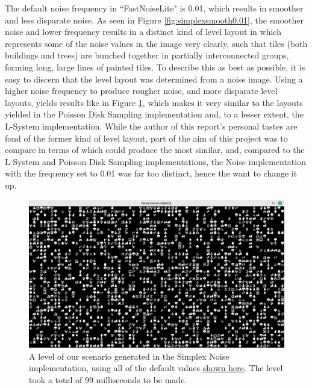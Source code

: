 The default noise frequency in ``FastNoiseLite" is 0.01, which results in smoother and less disparate noise. As seen in Figure \ref{fig:simplexsmooth0.01}, the smoother noise and lower frequency results in a distinct kind of level layout in which represents some of the noise values in the image very clearly, such that tiles (both buildings and trees) are bunched together in partially interconnected groups, forming long, large lines of painted tiles. To describe this as best as possible, it is easy to discern that the level layout was determined from a noise image. Using a higher noise frequency to produce rougher noise, and more disparate level layouts, yields results like in Figure \ref{fig:simplexsmoothdefault1}, which makes it very similar to the layouts yielded in the Poisson Disk Sampling implementation and, to a lesser extent, the L-System implementation. While the author of this report's personal tastes are fond of the former kind of level layout, part of the aim of this project was to compare in terms of which could produce the most similar, and, compared to the L-System and Poisson Disk Sampling implementations, the Noise implementation with the frequency set to 0.01 was far too distinct, hence the want to change it up.

\begin{figure}[H]
    \centering
    \includegraphics[width=\textwidth]{Images/simplex_smooth_default_1.png}
    \caption{A level of our scenario generated in the Simplex Noise implementation, using all of the default values \hyperref[noisedefaults]{shown here}. The level took a total of 99 milliseconds to be made.}
    \label{fig:simplexsmoothdefault1}
\end{figure}

